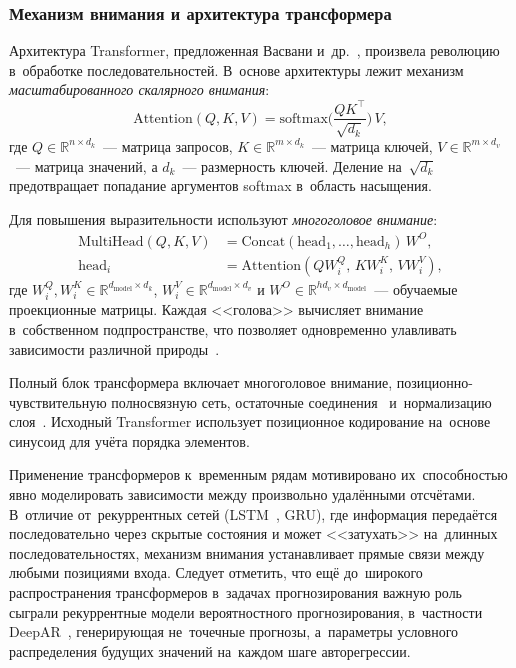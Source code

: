 \subsubsection{Механизм внимания и архитектура трансформера}
\label{sssec:attention}

Архитектура Transformer, предложенная Васвани
и~др.~\cite{vaswani2017attention}, произвела революцию в~обработке
последовательностей.  В~основе архитектуры лежит механизм
\textit{масштабированного скалярного внимания}:
\begin{equation}
\label{eq:attention}
\mathrm{Attention}(Q, K, V) = \mathrm{softmax}\!\biggl(\frac{QK^\top}{\sqrt{d_k}}\biggr)\,V,
\end{equation}
где $Q \in \mathbb{R}^{n \times d_k}$~--- матрица запросов,
$K \in \mathbb{R}^{m \times d_k}$~--- матрица ключей,
$V \in \mathbb{R}^{m \times d_v}$~--- матрица значений, а
$d_k$~--- размерность ключей.  Деление на~$\sqrt{d_k}$ предотвращает
попадание аргументов softmax в~область насыщения.

Для повышения выразительности используют \textit{многоголовое внимание}:
\begin{align}
\label{eq:multihead}
\mathrm{MultiHead}(Q, K, V) &= \mathrm{Concat}(\mathrm{head}_1, \ldots, \mathrm{head}_h)\, W^O, \nonumber\\
\mathrm{head}_i &= \mathrm{Attention}(Q W_i^Q,\, K W_i^K,\, V W_i^V),
\end{align}
где $W_i^Q, W_i^K \in \mathbb{R}^{d_{\mathrm{model}} \times d_k}$,
$W_i^V \in \mathbb{R}^{d_{\mathrm{model}} \times d_v}$ и
$W^O \in \mathbb{R}^{hd_v \times d_{\mathrm{model}}}$~--- обучаемые
проекционные матрицы.  Каждая <<голова>> вычисляет внимание
в~собственном подпространстве, что позволяет одновременно улавливать
зависимости различной природы~\cite{vaswani2017attention}.

Полный блок трансформера включает многоголовое внимание, позиционно-
чувствительную полносвязную сеть, остаточные
соединения~\cite{he2016resnet} и~нормализацию
слоя~\cite{ba2016layernorm}.  Исходный Transformer использует
позиционное кодирование на~основе синусоид для учёта порядка элементов.

Применение трансформеров к~временным рядам мотивировано их~способностью
явно моделировать зависимости между произвольно удалёнными отсчётами.
В~отличие от~рекуррентных сетей (LSTM~\cite{hochreiter1997lstm}, GRU),
где информация передаётся последовательно через скрытые состояния и
может <<затухать>> на~длинных последовательностях, механизм внимания
устанавливает прямые связи между любыми позициями входа.
Следует отметить, что ещё до~широкого распространения трансформеров
в~задачах прогнозирования важную роль сыграли рекуррентные модели
вероятностного прогнозирования, в~частности DeepAR~\cite{salinas2020deepar},
генерирующая не~точечные прогнозы, а~параметры условного распределения
будущих значений на~каждом шаге авторегрессии.

